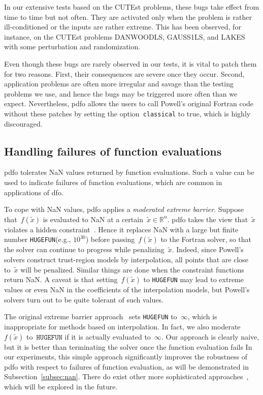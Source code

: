 \documentclass[manuscript,screen,review]{acmart}
\numberwithin{equation}{section}
\newcommand*{\R}{\mathbb{R}}
\newcommand*{\hugefun}{\texttt{HUGEFUN}\xspace}
\newcommand*{\obj}{f}
\begin{document}
In our extensive tests based on the CUTEst problems, these bugs take effect from time to time but not often.
They are activated only when the problem is rather ill-conditioned or the inputs are rather extreme.
This has been observed, for instance, on the CUTEst problems DANWOODLS, GAUSS1LS, and LAKES with some perturbation and randomization.

Even though these bugs are rarely observed in our tests, it is vital to patch them for two reasons.
First, their consequences are severe once they occur.
Second, application problems are often more irregular and savage than the testing problems we use, and hence the bugs may be triggered more often than we expect.
Nevertheless, \gls{pdfo} allows the users to call Powell's original Fortran code without these patches by setting the option~\texttt{classical} to true, which is highly discouraged.

\subsection{Handling failures of function evaluations}
\label{subsec:barrier}

\Gls{pdfo} tolerates NaN values returned by function evaluations.
Such a value can be used to indicate failures of function evaluations, which are common in applications of \gls{dfo}.

To cope with NaN values, \gls{pdfo} applies a \emph{moderated extreme barrier}.
Suppose that~$\obj(\tilde{x})$ is evaluated to NaN at a certain~$\tilde{x} \in \R^n$.
\Gls{pdfo} takes the view that~$\tilde{x}$ violates a hidden constraint~\cite{LeDigabel_Wild_2015,Audet_Caporossi_Jacquet_2020}.
Hence it replaces NaN with a large but finite number \hugefun (e.g., $10^{30}$) before passing~$\obj(\tilde{x})$ to the Fortran solver, so that the solver can continue to progress while penalizing~$\tilde{x}$.
Indeed, since Powell's solvers construct trust-region models by interpolation, all points that are close to~$\tilde{x}$ will be penalized.
Similar things are done when the constraint functions return NaN.
A caveat is that setting~$\obj(\tilde{x})$ to \hugefun may lead to extreme values or even NaN in the coefficients of the interpolation models, but Powell's solvers turn out to be quite tolerant of such values.

The original extreme barrier approach~\cite[equation~(13.2)]{Conn_Scheinberg_Vicente_2009b} sets \hugefun to~$\infty$, which is inappropriate for methods based on interpolation.
In fact, we also moderate~$\obj(\tilde{x})$ to~$\hugefun$ if it is actually evaluated to~$\infty$.
Our approach is clearly naive, but it is better than terminating the solver once the function evaluation fails
In our experiments, this simple approach significantly improves the robustness of \gls{pdfo} with respect to failures of function evaluation, as will be demonstrated in Subsection~\ref{subsec:nan}.
There do exist other more sophisticated approaches~\cite{Audet_Caporossi_Jacquet_2020}, which will be explored in the future.
\end{document}
